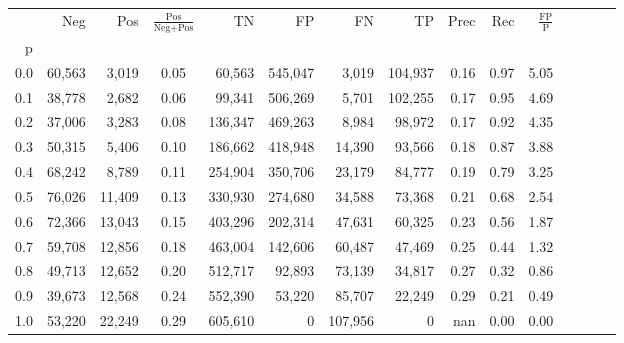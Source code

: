 \begin{tabular}{rrrcrrrrrrrrrrr}
\toprule
{} &     Neg &     Pos & $\frac{\text{Pos}}{\text{Neg}+\text{Pos}}$ &       TN &       FP &       FN &       TP &  Prec &   Rec & $\frac{\text{FP}}{\text{P}}$ \\
p   &         &         &                                            &          &          &          &          &       &       &                              \\
\midrule
0.0 &  60,563 &   3,019 &                                       0.05 &   60,563 &  545,047 &    3,019 &  104,937 &  0.16 &  0.97 &                         5.05 \\
0.1 &  38,778 &   2,682 &                                       0.06 &   99,341 &  506,269 &    5,701 &  102,255 &  0.17 &  0.95 &                         4.69 \\
0.2 &  37,006 &   3,283 &                                       0.08 &  136,347 &  469,263 &    8,984 &   98,972 &  0.17 &  0.92 &                         4.35 \\
0.3 &  50,315 &   5,406 &                                       0.10 &  186,662 &  418,948 &   14,390 &   93,566 &  0.18 &  0.87 &                         3.88 \\
0.4 &  68,242 &   8,789 &                                       0.11 &  254,904 &  350,706 &   23,179 &   84,777 &  0.19 &  0.79 &                         3.25 \\
0.5 &  76,026 &  11,409 &                                       0.13 &  330,930 &  274,680 &   34,588 &   73,368 &  0.21 &  0.68 &                         2.54 \\
0.6 &  72,366 &  13,043 &                                       0.15 &  403,296 &  202,314 &   47,631 &   60,325 &  0.23 &  0.56 &                         1.87 \\
0.7 &  59,708 &  12,856 &                                       0.18 &  463,004 &  142,606 &   60,487 &   47,469 &  0.25 &  0.44 &                         1.32 \\
0.8 &  49,713 &  12,652 &                                       0.20 &  512,717 &   92,893 &   73,139 &   34,817 &  0.27 &  0.32 &                         0.86 \\
0.9 &  39,673 &  12,568 &                                       0.24 &  552,390 &   53,220 &   85,707 &   22,249 &  0.29 &  0.21 &                         0.49 \\
1.0 &  53,220 &  22,249 &                                       0.29 &  605,610 &        0 &  107,956 &        0 &   nan &  0.00 &                         0.00 \\
\bottomrule
\end{tabular}

